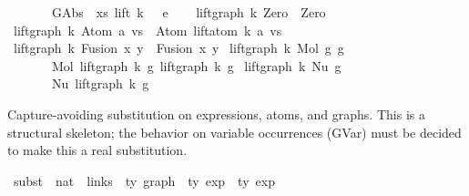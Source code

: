 \begin{isabellebody}
\ \ \ \ \ \ \ GAbs\ {\isasymtau}\ xs\ {\isacharparenleft}{\kern0pt}lift\ {\isacharparenleft}{\kern0pt}k\ {\isacharplus}{\kern0pt}\ {}{\isacharparenright}{\kern0pt}\ e{\isacharparenright}{\kern0pt}{\isachardoublequoteclose}\isanewline
\isanewline
\ \ \isanewline
{\isacharbar}{\kern0pt}\ {\isachardoublequoteopen}lift{\isacharunderscore}{\kern0pt}graph\ k\ Zero\ {\isacharequal}{\kern0pt}\ Zero{\isachardoublequoteclose}\isanewline
{\isacharbar}{\kern0pt}\ {\isachardoublequoteopen}lift{\isacharunderscore}{\kern0pt}graph\ k\ {\isacharparenleft}{\kern0pt}Atom\ a\ vs{\isacharparenright}{\kern0pt}\ {\isacharequal}{\kern0pt}\ Atom\ {\isacharparenleft}{\kern0pt}lift{\isacharunderscore}{\kern0pt}atom\ k\ a{\isacharparenright}{\kern0pt}\ vs{\isachardoublequoteclose}\isanewline
{\isacharbar}{\kern0pt}\ {\isachardoublequoteopen}lift{\isacharunderscore}{\kern0pt}graph\ k\ {\isacharparenleft}{\kern0pt}Fusion\ x\ y{\isacharparenright}{\kern0pt}\ {\isacharequal}{\kern0pt}\ Fusion\ x\ y{\isachardoublequoteclose}\isanewline
{\isacharbar}{\kern0pt}\ {\isachardoublequoteopen}lift{\isacharunderscore}{\kern0pt}graph\ k\ {\isacharparenleft}{\kern0pt}Mol\ g{}\ g{}{\isacharparenright}{\kern0pt}\ {\isacharequal}{\kern0pt}\isanewline
\ \ \ \ \ \ \ Mol\ {\isacharparenleft}{\kern0pt}lift{\isacharunderscore}{\kern0pt}graph\ k\ g{}{\isacharparenright}{\kern0pt}\ {\isacharparenleft}{\kern0pt}lift{\isacharunderscore}{\kern0pt}graph\ k\ g{}{\isacharparenright}{\kern0pt}{\isachardoublequoteclose}\isanewline
{\isacharbar}{\kern0pt}\ {\isachardoublequoteopen}lift{\isacharunderscore}{\kern0pt}graph\ k\ {\isacharparenleft}{\kern0pt}Nu\ g{\isacharparenright}{\kern0pt}\ {\isacharequal}{\kern0pt}\isanewline
\ \ \ \ \ \ \ Nu\ {\isacharparenleft}{\kern0pt}lift{\isacharunderscore}{\kern0pt}graph\ k\ g{\isacharparenright}{\kern0pt}{\isachardoublequoteclose}%
\begin{isamarkuptext}%
Capture-avoiding substitution  on expressions, atoms, and graphs.
This is a structural skeleton; the behavior on variable occurrences (GVar)
must be decided to make this a real substitution.%
\end{isamarkuptext}\isamarkuptrue%
\isamarkupfalse%
\ subst\ {\isacharcolon}{\kern0pt}{\isacharcolon}{\kern0pt}\ {\isachardoublequoteopen}nat\ {\isacharequal}{\kern0pt}{\isachargreater}{\kern0pt}\ links\ {\isacharequal}{\kern0pt}{\isachargreater}{\kern0pt}\ {\isacharprime}{\kern0pt}ty\ graph\ {\isacharequal}{\kern0pt}{\isachargreater}{\kern0pt}\ {\isacharprime}{\kern0pt}ty\ exp\ {\isacharequal}{\kern0pt}{\isachargreater}{\kern0pt}\ {\isacharprime}{\kern0pt}ty\ exp{\isachardoublequoteclose}\isanewline

\end{isabellebody}
